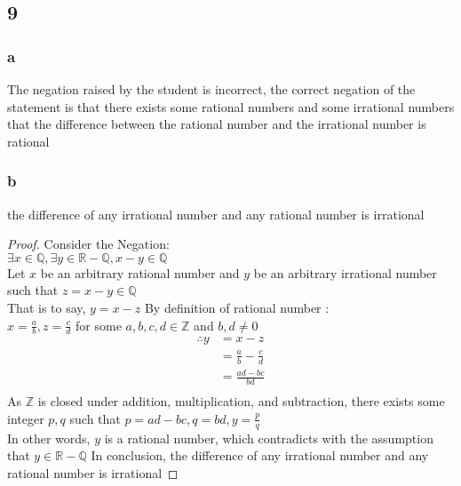 \documentclass{article}
\begin{document}
\subsection{9}
\subsubsection{a}
The negation raised by the student is incorrect, the correct negation of the statement is that there exists some rational numbers and some irrational numbers that the difference between the rational number and the irrational number is rational\\
\subsubsection{b}
the difference of any irrational number and any rational number is irrational
\begin{proof}
Consider the Negation:\\
$\exists x \in \mathbb{Q}, \exists y \in \mathbb{R} - \mathbb{Q}, x-y \in \mathbb{Q}$\\
Let $x$ be an arbitrary rational number and $y$ be an arbitrary irrational number such that  $z = x-y \in \mathbb{Q}$\\
That is to say, $y = x-z$
By definition of rational number :\\
$x = \frac{a}{b}, z = \frac{c}{d} $ for some $a,b,c,d \in \mathbb{Z}$ and $b,d \neq 0$\\
\begin{align*}
    \therefore
    y &= x - z \tag{By assumption}\\
    &= \frac{a}{b} - \frac{c}{d}\tag{By substitution}\\
    &= \frac{ad - bc}{bd} \tag{By algebra}\\
\end{align*}
As $\mathbb{Z}$ is closed under addition, multiplication, and subtraction, there exists some integer $p,q$ such that $p = ad - bc, q = bd, y = \frac{p}{q}$\\
In other words, $y$ is a rational number, which contradicts with the assumption that $ y \in \mathbb{R} - \mathbb{Q}$
In conclusion, the difference of any irrational number and any rational number is irrational
\end{proof}
\end{document}
